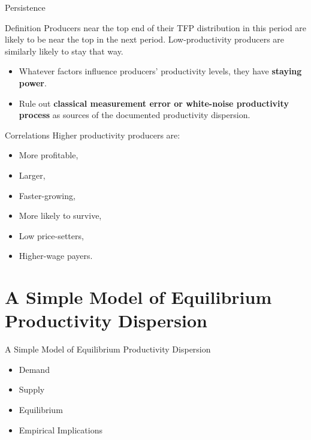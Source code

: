 \documentclass[aspectratio=169]{beamer}  %
\begin{document}
\begin{frame}{Persistence}
    \begin{block}{Definition}
        Producers near the top end of their TFP distribution in this period are likely to be near the top in the next period.
        Low-productivity producers are similarly likely to stay that way.
    \end{block}    
    \begin{itemize}
        \item Whatever factors influence producers' productivity levels, they have \textbf{staying power}.
        \item Rule out \textbf{classical measurement error or white-noise productivity process} as sources of the documented productivity dispersion.
    \end{itemize}
\end{frame}

\begin{frame}{Correlations}
    Higher productivity producers are:
    \begin{itemize}
        \item More profitable,
        \item Larger,
        \item Faster-growing,
        \item More likely to survive,
        \item Low price-setters,
        \item Higher-wage payers.
    \end{itemize}
\end{frame}

\section{A Simple Model of Equilibrium Productivity Dispersion}
\begin{frame}{A Simple Model of Equilibrium Productivity Dispersion}
    \begin{itemize}
        \item Demand
        \item Supply
        \item Equilibrium
        \item Empirical Implications
    \end{itemize}
\end{frame}
\end{document}
